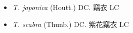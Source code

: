 \begin{itemize}
  \begin{itemize}
        \item[] \textit{T. japonica} (Houtt.) DC.  竊衣   LC
        \item[] \textit{T. scabra} (Thunb.) DC.  紫花竊衣   LC
  \end{itemize}
  \end{itemize}
